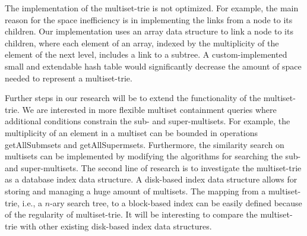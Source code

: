 \documentclass[algorithms,article,accept,pdftex,moreauthors]{Definitions/mdpi}
\begin{document}
The implementation of the multiset-trie is not optimized. For example, the main reason for the space inefficiency is in implementing the links from a node to its children. Our implementation uses an array data structure to link a node to its children, where each element of an array, indexed by the multiplicity of the element of the next level, includes a link to a subtree. A custom-implemented small and extendable hash table would significantly decrease the amount of space needed to represent a multiset-trie.

%
Further steps in our research will be to extend the functionality of the multiset-trie. We are interested in more flexible multiset containment queries where additional conditions constrain the sub- and super-multisets. For example, the multiplicity of an element in a multiset can be bounded in operations getAllSubmsets and getAllSupermsets. Furthermore, the similarity search on multisets can be implemented by modifying the algorithms for searching the sub- and super-multisets. 
%
The second line of research is to investigate the multiset-trie as a database index data structure. A disk-based index data structure allows for storing and managing a huge amount of multisets. The mapping from a multiset-trie, i.e., a $n$-ary search tree, to a block-based index can be easily defined because of the regularity of multiset-trie. It will be interesting to compare the multiset-trie with other existing disk-based index data structures.

\vspace{6pt} 



\end{document}
